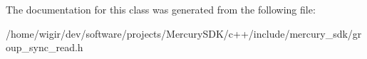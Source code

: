 The documentation for this class was generated from the following file\+:\begin{DoxyCompactItemize}
\item 
/home/wigir/dev/software/projects/\+Mercury\+S\+D\+K/c++/include/mercury\+\_\+sdk/group\+\_\+sync\+\_\+read.\+h\end{DoxyCompactItemize}
